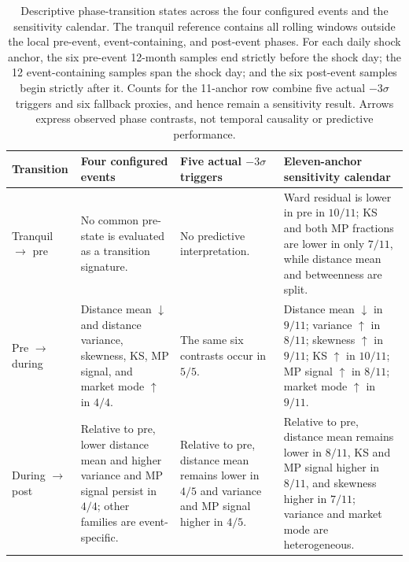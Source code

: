 \begin{table}[width=\textwidth,pos=h]
\centering
\caption{Descriptive phase-transition states across the four configured events and the sensitivity calendar. The tranquil reference contains all rolling windows outside the local pre-event, event-containing, and post-event phases. For each daily shock anchor, the six pre-event 12-month samples end strictly before the shock day; the 12 event-containing samples span the shock day; and the six post-event samples begin strictly after it. Counts for the 11-anchor row combine five actual $-3\sigma$ triggers and six fallback proxies, and hence remain a sensitivity result. Arrows express observed phase contrasts, not temporal causality or predictive performance.}
\label{tab:phase-transitions}
\scriptsize
\setlength{\tabcolsep}{4pt}
\renewcommand{\arraystretch}{1.12}
\begin{tabular*}{\tblwidth}{@{}p{}p{}p{}p{}@{}}
\toprule
Transition & Four configured events & Five actual $-3\sigma$ triggers & Eleven-anchor sensitivity calendar \\
\midrule
Tranquil $\rightarrow$ pre & No common pre-state is evaluated as a transition signature. & No predictive interpretation. & Ward residual is lower in pre in $10/11$; KS and both MP fractions are lower in only $7/11$, while distance mean and betweenness are split. \\
Pre $\rightarrow$ during & Distance mean $\downarrow$ and distance variance, skewness, KS, MP signal, and market mode $\uparrow$ in $4/4$. & The same six contrasts occur in $5/5$. & Distance mean $\downarrow$ in $9/11$; variance $\uparrow$ in $8/11$; skewness $\uparrow$ in $9/11$; KS $\uparrow$ in $10/11$; MP signal $\uparrow$ in $8/11$; market mode $\uparrow$ in $9/11$. \\
During $\rightarrow$ post & Relative to pre, lower distance mean and higher variance and MP signal persist in $4/4$; other families are event-specific. & Relative to pre, distance mean remains lower in $4/5$ and variance and MP signal higher in $4/5$. & Relative to pre, distance mean remains lower in $8/11$, KS and MP signal higher in $8/11$, and skewness higher in $7/11$; variance and market mode are heterogeneous. \\
\bottomrule
\end{tabular*}
\end{table}
